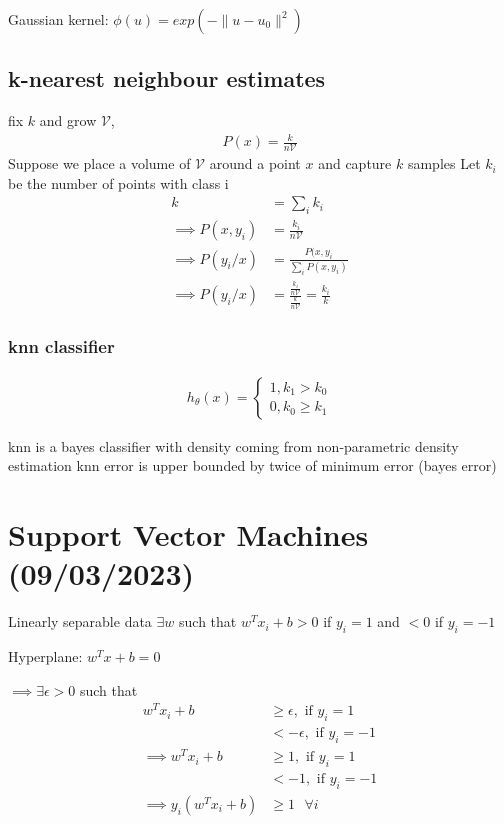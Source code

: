 \documentclass[11pt]{article}
\begin{document}
Gaussian kernel: \(\phi(u) = exp(- \lVert u - u_0 \rVert^2)\)

\subsection{k-nearest neighbour estimates}
\label{sec:orgeff8e8a}

fix \(k\) and grow \(\mathcal{V}\),
\begin{align*}
P(x) = \frac{k}{n \mathcal{V}}
\end{align*}
Suppose we place a volume of \(\mathcal{V}\) around a point \(x\) and capture \(k\) samples
Let \(k_i\) be the number of points with class i
\begin{align*}
k &= \sum_i k_i \\
\implies P(x, y_i) &= \frac{k_i}{n\mathcal{V}} \\
\implies P(y_i/x) &= \frac{P(x, y_i}{\sum_i P(x, y_i)} \\
\implies P(y_i/x) &= \frac{\frac{k_i}{n\mathcal{V}}}{\frac{k}{n\mathcal{V}}} = \frac{k_i}{k}
\end{align*}

\subsubsection{knn classifier}
\label{sec:org5d59e68}
\begin{align*}
h_{\theta}(x) = \begin{cases} 1, k_1 > k_0 \\ 0, k_0 \geq k_1 \end{cases}
\end{align*}

knn is a bayes classifier with density coming from non-parametric density estimation
knn error is upper bounded by twice of minimum error (bayes error)

\section{Support Vector Machines (09/03/2023)}
\label{sec:orgdb71189}

Linearly separable data
\(\exists w\) such that \(w^Tx_i + b > 0\) if \(y_i = 1\) and \(<0\) if \(y_i = -1\)

Hyperplane: \(w^Tx + b = 0\)

\(\implies \exists \epsilon > 0\) such that 
\begin{align*}
w^Tx_i + b &\geq \epsilon, \text{ if $y_i = 1$} \\
           &<   -\epsilon, \text{ if $y_i = -1$} \\
\implies w^Tx_i + b &\geq 1, \text{ if $y_i = 1$} \\
           &<   -1, \text{ if $y_i = -1$} \\
\implies y_i(w^Tx_i + b) &\geq 1 \text{ }\forall i
\end{align*}
\end{document}
